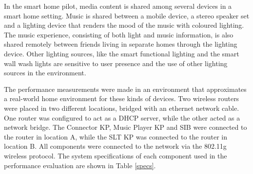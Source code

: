 

In the smart home pilot, media content is shared among several devices in a smart home setting. Music is shared between a mobile device, a stereo speaker set and a lighting device that renders the mood of the music with coloured lighting. The music experience, consisting of both light and music information, is also shared remotely between friends living in separate homes through the lighting device. Other lighting sources, like the smart functional lighting and the smart wall wash lights are sensitive to user presence and the use of other lighting sources in the environment.

The performance measurements were made in an environment that approximates a real-world home environment for these kinds of devices. Two wireless routers were placed in two different locations, bridged with an ethernet network cable. One router was configured to act as a DHCP server, while the other acted as a network bridge. The Connector \ac{KP}, Music Player \ac{KP} and \ac{SIB} were connected to the router in location A, while the \ac{SLT} KP was connected to the router in location B. All components were connected to the network via the 802.11g wireless protocol. The system specifications of each component used in the performance evaluation are shown in Table \ref{specs}.


